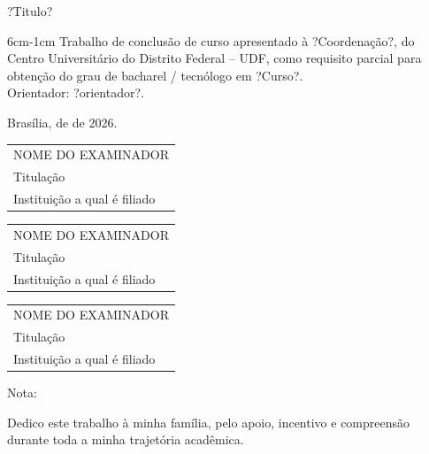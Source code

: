 \documentclass[
	12pt,	
    oneside,
    a4paper,
    brazil  
]{abntex2}
\begin{document}
\vspace*{10pt}
\begin{center}
?Titulo?
\vspace*{60pt}
\begin{adjustwidth}{6cm}{-1cm}
Trabalho de conclusão de curso apresentado à ?Coordenação?, do Centro Universitário do Distrito Federal -- UDF, como requisito parcial para obtenção do grau de bacharel / tecnólogo em ?Curso?. \\[2mm]

Orientador: ?orientador?. 
\end{adjustwidth}
\vspace*{40pt}
Brasília, \underline{\hspace{2cm}} de \underline{\hspace{4cm}} de 2026.

\vspace*{60pt}
\begin{tabular}{p{7cm}}
    \hline
    \centering NOME DO EXAMINADOR \\
    \centering Titulação \\
    \centering Instituição a qual é filiado
\end{tabular}

\vspace*{30pt}
\begin{tabular}{p{7cm}}
    \hline
    \centering NOME DO EXAMINADOR \\
    \centering Titulação \\
    \centering Instituição a qual é filiado
\end{tabular}

\vspace*{30pt}
\begin{tabular}{p{7cm}}
    \hline
    \centering NOME DO EXAMINADOR \\
    \centering Titulação \\
    \centering Instituição a qual é filiado
\end{tabular}
\end{center}

\vspace*{40pt}
Nota: \underline{\hspace{2cm}}


\newpage
\begin{dedicatoria2}{}
 Dedico este trabalho à minha família, pelo apoio, incentivo e compreensão durante toda a minha trajetória acadêmica.
 \end{dedicatoria2}
\end{document}
